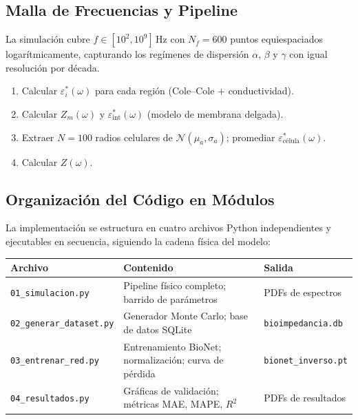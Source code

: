 \documentclass[12pt]{article}
\begin{document}
\subsection{Malla de Frecuencias y Pipeline}

La simulaci\'on cubre $f \in [10^2, 10^9]\,\text{Hz}$ con $N_f = 600$ puntos equiespaciados
logar\'itmicamente, capturando los reg\'imenes de dispersi\'on $\alpha$, $\beta$ y $\gamma$
con igual resoluci\'on por d\'ecada.

\begin{enumerate}
\item Calcular $\varepsilon_i^*(\omega)$ para cada regi\'on (Cole--Cole + conductividad).
\item Calcular $Z_m(\omega)$ y $\varepsilon_{\text{int}}^*(\omega)$ (modelo de membrana
delgada).
\item Extraer $N = 100$ radios celulares de $\mathcal{N}(\mu_a, \sigma_a)$; promediar
$\varepsilon_{\text{c\'elula}}^*(\omega)$.
\item Calcular $Z(\omega)$.
\end{enumerate}

\subsection{Organizaci\'on del C\'odigo en M\'odulos}

La implementaci\'on se estructura en cuatro archivos Python independientes y ejecutables
en secuencia, siguiendo la cadena f\'isica del modelo:

\begin{center}
\renewcommand{\arraystretch}{1.35}
\begin{tabular}{@{}lll@{}}
\toprule
\textbf{Archivo} & \textbf{Contenido} & \textbf{Salida} \\
\midrule
\texttt{01\_simulacion.py}     & Pipeline f\'isico completo; barrido de par\'ametros & PDFs de espectros \\
\texttt{02\_generar\_dataset.py} & Generador Monte Carlo; base de datos SQLite & \texttt{bioimpedancia.db} \\
\texttt{03\_entrenar\_red.py}  & Entrenamiento BioNet; normalizaci\'on; curva de p\'erdida & \texttt{bionet\_inverso.pt} \\
\texttt{04\_resultados.py}     & Gr\'aficas de validaci\'on; m\'etricas MAE, MAPE, $R^2$ & PDFs de resultados \\
\bottomrule
\end{tabular}
\end{center}
\end{document}
